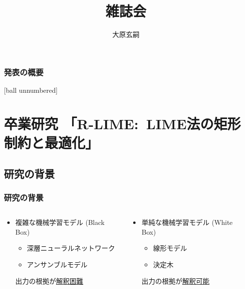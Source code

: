 \documentclass[aspectratio=169]{slide-ja}
\title{雑誌会}
\author{大原玄嗣}
\institute{情報認識学研究室 M1}
\begin{document}
\begin{frame}
  \frametitle{発表の概要}
  [ball unnumbered]
  \setcounter{tocdepth}{1} %
  \tableofcontents
\end{frame}

\section[卒業研究 \\ R-LIME:\@~LIME法の矩形制約と最適化]{%
  卒業研究 「R-LIME:~LIME法の矩形制約と最適化」
 }

\subsection{研究の背景}
\begin{frame}
  \frametitle{研究の背景}
  \bigskip
  \begin{columns}[]
    \begin{column}{0.5\textwidth}
      \begin{itemize}
        \item 複雑な機械学習モデル (Black Box)
              \begin{itemize}
                \item 深層ニューラルネットワーク
                \item アンサンブルモデル
              \end{itemize}
              \smallskip
              \textrightarrow{}出力の根拠が\underline{解釈困難}
      \end{itemize}
      \centering
    \end{column}
    \begin{column}{0.5\textwidth}
      \begin{itemize}
        \item 単純な機械学習モデル (White Box)
              \begin{itemize}
                \item 線形モデル
                \item 決定木
              \end{itemize}
              \smallskip
              \textrightarrow{}出力の根拠が\underline{解釈可能}
      \end{itemize}
      \centering
    \end{column}
  \end{columns}
\end{frame}
\end{document}
